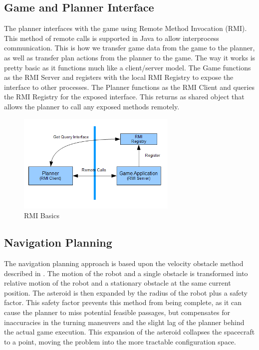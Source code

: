 \documentclass[10pt,final,conference]{IEEEtran}
\begin{document}
\subsection{Game and Planner Interface}
The planner interfaces with the game using Remote Method Invocation (RMI).  This method of remote calls is supported in Java to allow interprocess communication.  This is how we transfer game data from the game to the planner, as well as transfer plan actions from the planner to the game.  The way it works is pretty basic as it functions much like a client/server model.  The Game functions as the RMI Server and registers with the local RMI Registry to expose the interface to other processes.  The Planner functions as the RMI Client and queries the RMI Registry for the exposed interface.  This returns as shared object that allows the planner to call any exposed methods remotely.

\begin{figure}[ht]
\centering
\includegraphics[width=3in]{./RMI.png}
\caption{RMI Basics}
\label{fig_rmi}
\end{figure}

\subsection{Navigation Planning}

The navigation planning approach is based upon the velocity obstacle method described in \cite{fiorini1998motion}. The motion of the robot and a single obstacle is transformed into relative motion of the robot and a stationary obstacle at the same current position. The asteroid is then expanded by the radius of the robot plus a safety factor. This safety factor prevents this method from being complete, as it can cause the planner to miss potential feasible passages, but compensates for inaccuracies in the turning maneuvers and the slight lag of the planner behind the actual game execution. This expansion of the asteroid collapses the spacecraft to a point, moving the problem into the more tractable configuration space. 
\end{document}
